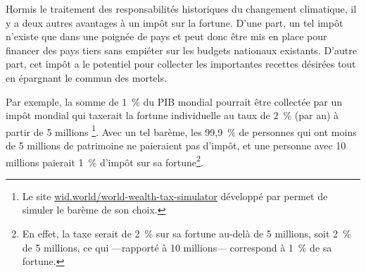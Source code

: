 \documentclass[a5paper,french,openany]{memoir}
\begin{document}
Hormis le traitement des responsabilités historiques du changement climatique, il y a deux autres avantages à un impôt sur la fortune. D'une part, un tel impôt n'existe que dans une poignée de pays et peut donc être mis en place pour financer des pays tiers sans empiéter sur les budgets nationaux existants. D'autre part, cet impôt a le potentiel pour collecter %
les importantes recettes désirées tout en épargnant le commun des mortels. %

Par exemple, la somme de 1~\% du PIB mondial pourrait être collectée par un impôt mondial qui taxerait la fortune individuelle au taux de 2~\% (par an) à partir de 5 millions%
\footnote{
Le site \href{https://wid.world/world-wealth-tax-simulator/}{wid.world/world-wealth-tax-simulator} développé par \cite{chancel_world_2022} permet de simuler le barème de son choix.}. %
Avec un tel barème, les 99,9~\% de personnes qui ont moins de 5 millions de patrimoine ne paieraient pas d'impôt, et une personne avec 10 millions paierait 1~\% d'impôt sur sa fortune\footnote{En effet, la taxe serait de 2~\% sur sa fortune au-delà de 5 millions, soit 2~\% de 5 millions, ce qui ---rapporté à 10 millions--- correspond à 1~\% de sa fortune.}. 
\end{document}
